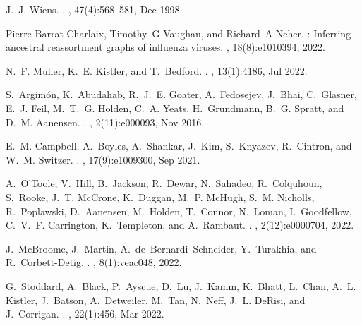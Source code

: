 \documentclass[webpdf,contemporary,large,single]{oup-authoring-template}%
\theoremstyle{thmstyleone}%
\theoremstyle{thmstyletwo}%
\theoremstyle{thmstylethree}%
\begin{document}
\begin{thebibliography}{10}
J.~J. Wiens.
.
, 47(4):568--581, Dec 1998.

Pierre Barrat-Charlaix, Timothy~G Vaughan, and Richard~A Neher.
: Inferring ancestral reassortment graphs of influenza
  viruses.
, 18(8):e1010394, 2022.

N.~F. Muller, K.~E. Kistler, and T.~Bedford.
.
, 13(1):4186, Jul 2022.

S.~Argim\'{o}n, K.~Abudahab, R.~J.~E. Goater, A.~Fedosejev, J.~Bhai,
  C.~Glasner, E.~J. Feil, M.~T.~G. Holden, C.~A. Yeats, H.~Grundmann, B.~G.
  Spratt, and D.~M. Aanensen.
.
, 2(11):e000093, Nov 2016.

E.~M. Campbell, A.~Boyles, A.~Shankar, J.~Kim, S.~Knyazev, R.~Cintron, and
  W.~M. Switzer.
.
, 17(9):e1009300, Sep 2021.

A.~O'Toole, V.~Hill, B.~Jackson, R.~Dewar, N.~Sahadeo, R.~Colquhoun, S.~Rooke,
  J.~T. McCrone, K.~Duggan, M.~P. McHugh, S.~M. Nicholls, R.~Poplawski,
  D.~Aanensen, M.~Holden, T.~Connor, N.~Loman, I.~Goodfellow, C.~V.~F.
  Carrington, K.~Templeton, and A.~Rambaut.
.
, 2(12):e0000704, 2022.

J.~McBroome, J.~Martin, A.~de~Bernardi~Schneider, Y.~Turakhia, and
  R.~Corbett-Detig.
.
, 8(1):veac048, 2022.

G.~Stoddard, A.~Black, P.~Ayscue, D.~Lu, J.~Kamm, K.~Bhatt, L.~Chan, A.~L.
  Kistler, J.~Batson, A.~Detweiler, M.~Tan, N.~Neff, J.~L. DeRisi, and
  J.~Corrigan.
.
, 22(1):456, Mar 2022.


\end{thebibliography}
\end{document}
